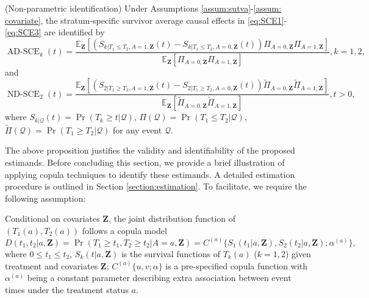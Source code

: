 \documentclass[APA,Times1COL]{WileyNJDv5} %
\theoremstyle{plain}
\def\bfZ{\mathbf{Z}}
\def\Pr{\operatorname{Pr}}
\begin{document}
\begin{proposition}
\label{prop:scae}
(Non-parametric identification) Under Assumptions \ref{assum:sutva}-\ref{assum: covariate}, the stratum-specific survivor average causal effects in \eqref{eq:SCE1}-\eqref{eq:SCE3} are identified by
\begin{equation}
\operatorname{AD-SCE}_k(t)
= \frac{\mathbb{E}_{\bfZ}\left[(S_{k|T_1\leq T_2,A=1,\bfZ}(t)-S_{k|T_1\leq T_2,A=0,\bfZ}(t) )\Pi_{A=0,\bfZ}\Pi_{A=1,\bfZ} \right]}{\mathbb{E}_{\bfZ}\left[\Pi_{A=0,\bfZ}\Pi_{A=1,\bfZ} \right]}, k=1,2,
\label{eq:adSCE}
\end{equation}
and 
\begin{equation}
\operatorname{ND-SCE}_2(t)
= \frac{\mathbb{E}_{\bfZ}\left[ (S_{2|T_1\geq T_2,A=1,\bfZ}(t)-S_{2|T_1\geq T_2,A=0,\bfZ}(t))\widetilde{\Pi}_{A=0,\bfZ}\widetilde{\Pi}_{A=1,\bfZ} \right]}{\mathbb{E}_{\bfZ}\left[\widetilde{\Pi}_{A=0,\bfZ}\widetilde{\Pi}_{A=1,\bfZ} \right]}, t>0,
\label{eq:ndSCE}
\end{equation}
where $S_{k|\mathcal{Q}}(t)=\Pr(T_k\geq t|\mathcal{Q})$, $\Pi(\mathcal{Q}) = \Pr(T_1\leq T_2|\mathcal{Q})$, $\widetilde{\Pi}(\mathcal{Q}) = \Pr(T_1\geq T_2|\mathcal{Q})$ for any event $\mathcal{Q}$.
\end{proposition}

The above proposition justifies the validity and identifiability of the proposed estimands. Before concluding this section, we provide a brief illustration of applying copula techniques to identify these estimands. A detailed estimation procedure is outlined in Section \ref{section:estimation}. To facilitate, we require the following assumption:
\begin{assumption}
Conditional on covariates $\bfZ$, the joint distribution function of $(T_1(a),T_2(a))$ follows a copula model
\begin{equation}
D(t_1,t_2|a,\bfZ) = \Pr (T_1\geq t_1, T_2\geq t_2| A=a, \bfZ)
= C^{(a)}\{S_1(t_1|a,\bfZ),S_2(t_2|a,\bfZ);\alpha^{(a)}\}, \quad 
\label{model: copula}
\end{equation}
where $0\leq t_1\leq t_2$, $S_k(t|a,\bfZ)$ is the survival functions of $T_k(a)$ ($k=1,2$) given treatment and covariates $\bfZ$; $C^{(a)}\{u,v;\alpha\}$ is a pre-specified copula function with $\alpha^{(a)}$ being a constant parameter describing extra association between event times under the treatment status $a$.
\label{assum:cross-world}
\end{assumption}
\end{document}
